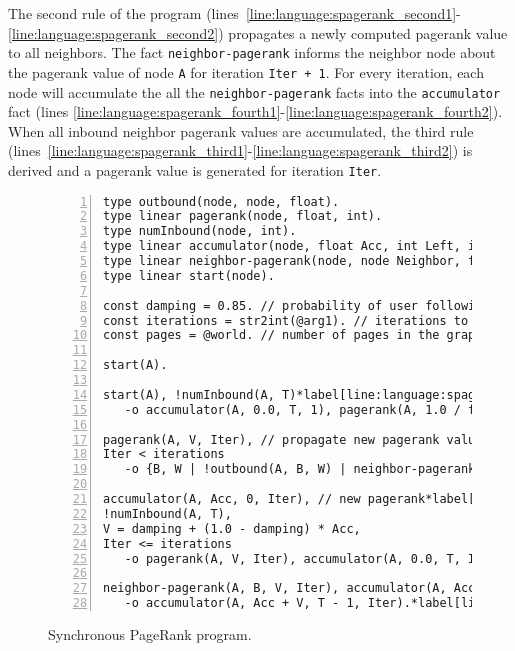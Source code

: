 The second rule of the program
(lines~\ref{line:language:spagerank_second1}-\ref{line:language:spagerank_second2})
propagates a newly computed pagerank value to all neighbors. The fact
\texttt{neighbor-pagerank} informs the neighbor node about the pagerank value of
node \texttt{A} for iteration \texttt{Iter + 1}. For every iteration, each node
will accumulate the all the \texttt{neighbor-pagerank} facts into the
\texttt{accumulator} fact (lines
\ref{line:language:spagerank_fourth1}-\ref{line:language:spagerank_fourth2}).
When all inbound neighbor pagerank values are accumulated, the third rule
(lines~\ref{line:language:spagerank_third1}-\ref{line:language:spagerank_third2})
is derived and a pagerank value is generated for iteration \texttt{Iter}.

\begin{figure}[h!]
\begin{Verbatim}[numbers=left,fontsize=\codesize,commandchars=\*\[\]]
type outbound(node, node, float).
type linear pagerank(node, float, int).
type numInbound(node, int).
type linear accumulator(node, float Acc, int Left, int Iteration).
type linear neighbor-pagerank(node, node Neighbor, float Rank, int Iteration).
type linear start(node).

const damping = 0.85. // probability of user following a link in the current page.
const iterations = str2int(@arg1). // iterations to compute.
const pages = @world. // number of pages in the graph.

start(A).

start(A), !numInbound(A, T)*label[line:language:spagerank_first1]
   -o accumulator(A, 0.0, T, 1), pagerank(A, 1.0 / float(pages), 0).*label[line:language:spagerank_first2]

pagerank(A, V, Iter), // propagate new pagerank value*label[line:language:spagerank_second1]
Iter < iterations
   -o {B, W | !outbound(A, B, W) | neighbor-pagerank(B, A, V * W, Iter + 1)}.*label[line:language:spagerank_second2]

accumulator(A, Acc, 0, Iter), // new pagerank*label[line:language:spagerank_third1]
!numInbound(A, T),
V = damping + (1.0 - damping) * Acc,
Iter <= iterations
   -o pagerank(A, V, Iter), accumulator(A, 0.0, T, Iter + 1).*label[line:language:spagerank_third2]
	
neighbor-pagerank(A, B, V, Iter), accumulator(A, Acc, T, Iter)*label[line:language:spagerank_fourth1]
   -o accumulator(A, Acc + V, T - 1, Iter).*label[line:language:spagerank_fourth2]
\end{Verbatim}
\caption{Synchronous PageRank program.}
\label{language:code:pagerank}
\end{figure}


